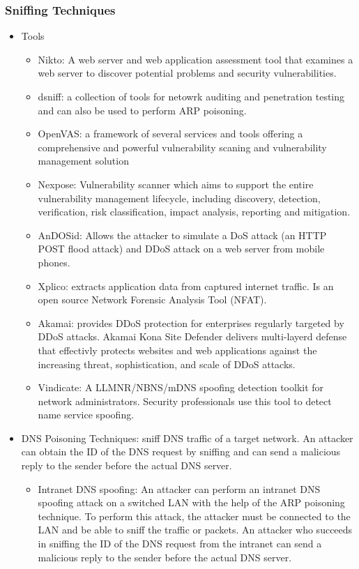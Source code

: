 \subsubsection{Sniffing Techniques}
\begin{itemize}
    \item Tools
    \begin{itemize}
        \item Nikto: A web server and web application assessment tool that examines a web server to discover potential problems and security vulnerabilities.
        \item dsniff: a collection of tools for netowrk auditing and penetration testing and can also be used to perform ARP poisoning.
        \item OpenVAS: a framework of several services and tools offering a comprehensive and powerful vulnerability scaning and vulnerability management solution
        \item Nexpose: Vulnerability scanner which aims to support the entire vulnerability management lifecycle, including discovery, detection, verification, risk classification, impact analysis, reporting and mitigation.
        \item AnDOSid: Allows the attacker to simulate a DoS attack (an HTTP POST flood attack) and DDoS attack on a web server from mobile phones.
        \item Xplico: extracts application data from captured internet traffic. Is an open source Network Forensic Analysis Tool (NFAT).
        \item Akamai: provides DDoS protection for enterprises regularly targeted by DDoS attacks. Akamai Kona Site Defender delivers multi-layerd defense that effectivly protects websites and web applications against the increasing threat, sophistication, and scale of DDoS attacks.
        \item Vindicate: A LLMNR/NBNS/mDNS spoofing detection toolkit for network administrators. Security professionals use this tool to detect name service spoofing.
    \end{itemize}
    \item DNS Poisoning Techniques: sniff DNS traffic of a target network. An attacker can obtain the ID of the DNS request by sniffing and can send a malicious reply to the sender before the actual DNS server.
    \begin{itemize}
        \item Intranet DNS spoofing: An attacker can perform an intranet DNS spoofing attack on a switched LAN with the help of the ARP poisoning technique. To perform this attack, the attacker must be connected to the LAN and be able to sniff the traffic or packets. An attacker who succeeds in sniffing the ID of the DNS request from the intranet can send a malicious reply to the sender before the actual DNS server.

\end{itemize}
\end{itemize}
